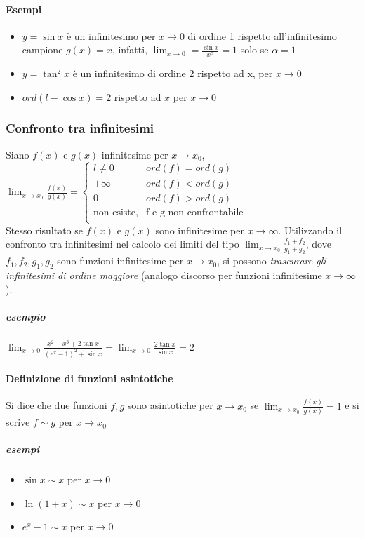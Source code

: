 \paragraph{Esempi}
\begin{itemize}
	\item $y=\sin{x}$ è un infinitesimo per $x\to 0$ di ordine 1 rispetto all'infinitesimo campione $g(x)=x$, infatti, $\lim_{x\to 0}=\frac{\sin{x}}{x^\alpha}=1$ solo se $\alpha = 1$
	\item $y=\tan^2x$ è un infinitesimo di ordine 2 rispetto ad x, per $x\to 0$
	\item $ord(l-\cos{x})=2$ rispetto ad $x$ per $x\to 0$
\end{itemize}
\subsubsection{Confronto tra infinitesimi}
Siano $f(x)$ e $g(x)$ infinitesime per $x\to x_{0}$,\\
$\lim_{x\to x_0}\frac{f(x)}{g(x)}=
\begin{cases}
l\neq 0&ord(f)=ord(g)\\
\pm \infty&ord(f)<ord(g)\\
0&ord(f)>ord(g)\\
	\text{non esiste,} & \text{f e g non confrontabile} \\ 
\end{cases}
$\\
Stesso risultato se $f(x)$ e $g(x)$ sono infinitesime per $x\to \infty$. Utilizzando il confronto tra infinitesimi nel calcolo dei limiti del tipo $\lim_{x\to x_0}\frac{f_1+f_2}{g_1+g_2}$, dove $f_1,f_2,g_1,g_2$ sono funzioni infinitesime per $x\to x_0$, si possono {\color{blue} \em trascurare gli infinitesimi di ordine maggiore} (analogo discorso per funzioni infinitesime $x\to \infty$).
\subparagraph{esempio}
$\lim_{x\to 0}\frac{x^2+x^3+2\tan{x}}{(e^x-1)^2+\sin{x}}=\lim_{x\to 0}\frac{2\tan x}{\sin x}=2$
\paragraph{Definizione di funzioni asintotiche}
Si dice che due funzioni $f,g$ sono asintotiche per $x\to x_0$ se $\lim_{x\to x_0}\frac{f(x)}{g(x)}=1$ e si scrive $f\sim g$ per $x\to x_0$
\subparagraph{esempi}
\begin{itemize}
	\item $\sin x\sim x$ per $x\to 0$
	\item $\ln(1+x)\sim x$ per $x\to 0$
	\item $e^x-1\sim x$ per $x\to 0$ 
\end{itemize}
